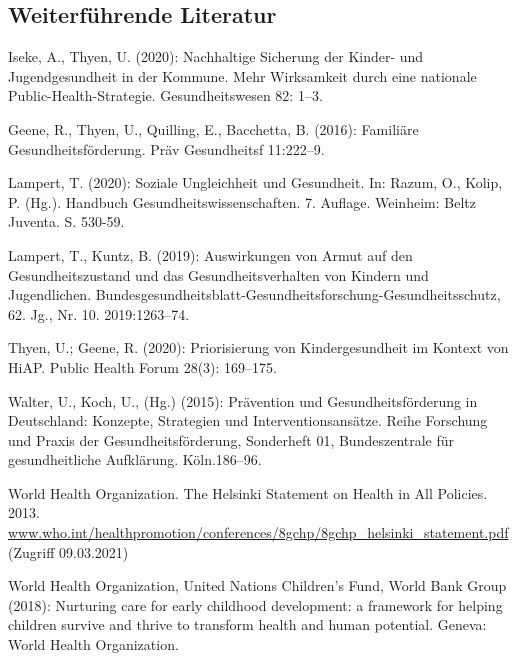 \documentclass{article}
\begin{document}
\subsection{Weiterführende Literatur}\label{H5850222}



Iseke, A., Thyen, U. (2020): Nachhaltige Sicherung der Kinder- und Jugendgesundheit in der Kommune. Mehr Wirksamkeit durch eine nationale Public-Health-Strategie. Gesundheitswesen 82: 1–3.


Geene, R., Thyen, U., Quilling, E., Bacchetta, B. (2016): Familiäre Gesundheitsförderung. Präv Gesundheitsf 11:222–9.


Lampert, T. (2020): Soziale Ungleichheit und Gesundheit. In: Razum, O., Kolip, P. (Hg.). Handbuch Gesundheitswissenschaften. 7. Auflage. Weinheim: Beltz Juventa. S. 530-59.


Lampert, T., Kuntz, B. (2019): Auswirkungen von Armut auf den Gesundheitszustand und das Gesundheitsverhalten von Kindern und Jugendlichen. Bundesgesundheitsblatt-Gesundheitsforschung-Gesundheitsschutz, 62. Jg., Nr. 10. 2019:1263–74.


Thyen, U.; Geene, R. (2020): Priorisierung von Kindergesundheit im Kontext von HiAP. Public Health Forum 28(3): 169–175.


Walter, U., Koch, U., (Hg.) (2015): Prävention und Gesundheitsförderung in Deutschland: Konzepte, Strategien und Interventionsansätze. Reihe Forschung und Praxis der Gesundheitsförderung, Sonderheft 01, Bundeszentrale für gesundheitliche Aufklärung. Köln.186–96.


World Health Organization. The Helsinki Statement on Health in All Policies. 2013. \href{http://www.who.int/healthpromotion/conferences/8gchp/8gchp_helsinki_statement.pdf}{www.who.int/healthpromotion/conferences/8gchp/8gchp\_helsinki\_statement.pdf} (Zugriff 09.03.2021)


World Health Organization, United Nations Children’s Fund, World Bank Group (2018): Nurturing care for early childhood development: a framework for helping children survive and thrive to transform health and human potential. Geneva: World Health Organization.
\end{document}
